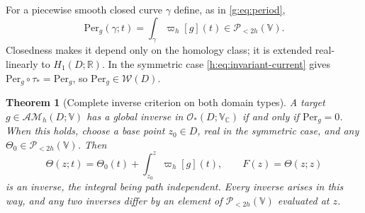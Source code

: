 \documentclass[11pt,a4paper]{article}
\numberwithin{equation}{section}
\newtheorem{theorem}{Theorem}[section]
\theoremstyle{definition}
\theoremstyle{remark}
\theoremstyle{plain}
\newcommand{\RR}{\mathbb R}
\newcommand{\CC}{\mathbb C}
\newcommand{\AM}{\mathcal{AM}}
\newcommand{\Per}{\mathrm{Per}}
\newcommand{\VV}{\mathbb V}                       %
\newcommand{\VC}{\mathbb V_{\CC}}                 %
\newcommand{\PolH}{\mathscr P_{<2h}(\VV)}
\newcommand{\cur}{\varpi}                         %
\newcommand{\Herm}{\Theta}                        %
\begin{document}
For a piecewise smooth closed curve $\gamma$ define, as in \eqref{g:eq:period},
\begin{equation}\label{h:eq:period}
 \Per_g(\gamma;t)=\int_\gamma\cur_h[g](t)\in\PolH .
\end{equation}
Closedness makes it depend only on the homology class; it is extended
real-linearly to $H_1(D;\RR)$. In the symmetric case
\eqref{h:eq:invariant-current} gives $\Per_g\circ\tau_*=\Per_g$, so
$\Per_g\in\mathscr W(D)$.

\begin{theorem}[Complete inverse criterion on both domain types]
\label{h:thm:inverse}
A target $g\in\AM_h(D;\VV)$ has a global inverse in $\mathcal O_*(D;\VC)$ if
and only if $\Per_g=0$. When this holds, choose a base point $z_0\in D$, real
in the symmetric case, and any $\Herm_0\in\PolH$. Then
\begin{equation}\label{h:eq:inverse-integral}
 \Herm(z;t)=\Herm_0(t)+\int_{z_0}^{z}\cur_h[g](t),\qquad F(z)=\Herm(z;z)
\end{equation}
is an inverse, the integral being path independent. Every inverse arises in
this way, and any two inverses differ by an element of $\PolH$ evaluated at
$z$.
\end{theorem}
\end{document}
